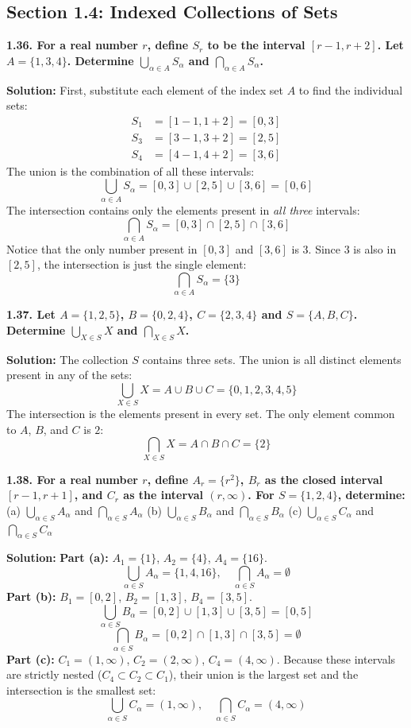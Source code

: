 \documentclass[12pt]{article}
\begin{document}
\subsection{Section 1.4: Indexed Collections of Sets}

\textbf{1.36. For a real number $r$, define $S_r$ to be the interval $[r-1, r+2]$. Let $A = \{1, 3, 4\}$. Determine $\bigcup_{\alpha \in A} S_\alpha$ and $\bigcap_{\alpha \in A} S_\alpha$.}

\textbf{Solution:}
First, substitute each element of the index set $A$ to find the individual sets:
\begin{align*}
    S_1 &= [1-1, 1+2] = [0, 3] \\
    S_3 &= [3-1, 3+2] = [2, 5] \\
    S_4 &= [4-1, 4+2] = [3, 6]
\end{align*}
The union is the combination of all these intervals:
\[ \bigcup_{\alpha \in A} S_\alpha = [0, 3] \cup [2, 5] \cup [3, 6] = [0, 6] \]
The intersection contains only the elements present in \textit{all three} intervals:
\[ \bigcap_{\alpha \in A} S_\alpha = [0, 3] \cap [2, 5] \cap [3, 6] \]
Notice that the only number present in $[0, 3]$ and $[3, 6]$ is $3$. Since $3$ is also in $[2, 5]$, the intersection is just the single element:
\[ \bigcap_{\alpha \in A} S_\alpha = \{3\} \]

\hrulefill

\textbf{1.37. Let $A = \{1, 2, 5\}$, $B = \{0, 2, 4\}$, $C = \{2, 3, 4\}$ and $S = \{A, B, C\}$. Determine $\bigcup_{X \in S} X$ and $\bigcap_{X \in S} X$.}

\textbf{Solution:}
The collection $S$ contains three sets. 
The union is all distinct elements present in any of the sets:
\[ \bigcup_{X \in S} X = A \cup B \cup C = \{0, 1, 2, 3, 4, 5\} \]
The intersection is the elements present in every set. The only element common to $A$, $B$, and $C$ is $2$:
\[ \bigcap_{X \in S} X = A \cap B \cap C = \{2\} \]

\hrulefill

\textbf{1.38. For a real number $r$, define $A_r = \{r^2\}$, $B_r$ as the closed interval $[r-1, r+1]$, and $C_r$ as the interval $(r, \infty)$. For $S = \{1, 2, 4\}$, determine:}
(a) $\bigcup_{\alpha \in S} A_\alpha$ and $\bigcap_{\alpha \in S} A_\alpha$
(b) $\bigcup_{\alpha \in S} B_\alpha$ and $\bigcap_{\alpha \in S} B_\alpha$
(c) $\bigcup_{\alpha \in S} C_\alpha$ and $\bigcap_{\alpha \in S} C_\alpha$

\textbf{Solution:}
\textbf{Part (a):} $A_1 = \{1\}$, $A_2 = \{4\}$, $A_4 = \{16\}$.
\[ \bigcup_{\alpha \in S} A_\alpha = \{1, 4, 16\}, \quad \bigcap_{\alpha \in S} A_\alpha = \emptyset \]
\textbf{Part (b):} $B_1 = [0, 2]$, $B_2 = [1, 3]$, $B_4 = [3, 5]$.
\[ \bigcup_{\alpha \in S} B_\alpha = [0, 2] \cup [1, 3] \cup [3, 5] = [0, 5] \]
\[ \bigcap_{\alpha \in S} B_\alpha = [0, 2] \cap [1, 3] \cap [3, 5] = \emptyset \]
\textbf{Part (c):} $C_1 = (1, \infty)$, $C_2 = (2, \infty)$, $C_4 = (4, \infty)$.
Because these intervals are strictly nested ($C_4 \subset C_2 \subset C_1$), their union is the largest set and the intersection is the smallest set:
\[ \bigcup_{\alpha \in S} C_\alpha = (1, \infty), \quad \bigcap_{\alpha \in S} C_\alpha = (4, \infty) \]
\end{document}
